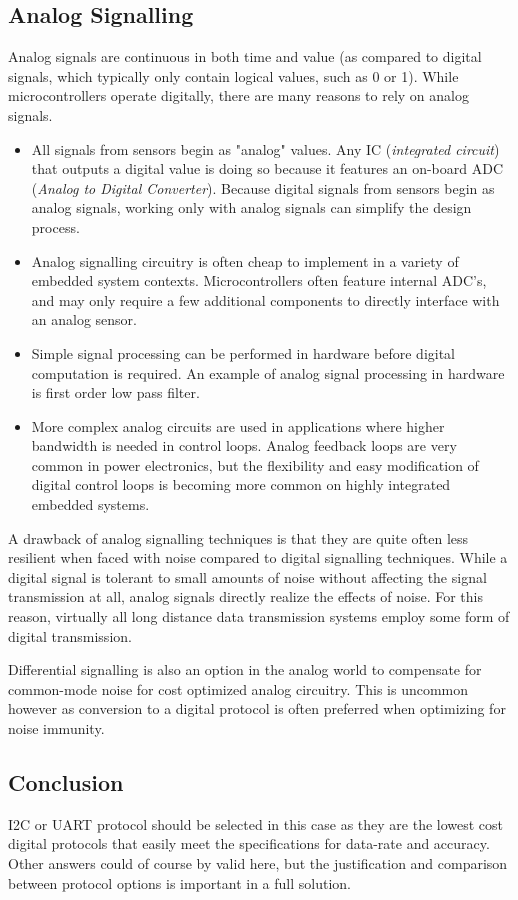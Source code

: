 \documentclass[main.tex]{subfiles}
\begin{document}
\subsection{Analog Signalling}
Analog signals are continuous in both time and value (as compared to digital signals, which typically only contain logical values, such as 0 or 1). While microcontrollers operate digitally, there are many reasons to rely on analog signals.
\begin{itemize}
    \item All signals from sensors begin as "analog" values. Any IC (\textit{integrated circuit}) that outputs a digital value is doing so because it features an on-board ADC (\textit{Analog to Digital Converter}). Because digital signals from sensors begin as analog signals, working only with analog signals can simplify the design process.
    \item Analog signalling circuitry is often cheap to implement in a variety of embedded system contexts. Microcontrollers often feature internal ADC's, and may only require a few additional components to directly interface with an analog sensor.
    \item Simple signal processing can be performed in hardware before digital computation is required. An example of analog signal processing in hardware is first order low pass filter. 
    \item More complex analog circuits are used in applications where higher bandwidth is needed in control loops. Analog feedback loops are very common in power electronics, but the flexibility and easy modification of digital control loops is becoming more common on highly integrated embedded systems.
\end{itemize}

\noindent A drawback of analog signalling techniques is that they are quite often less resilient when faced with noise compared to digital signalling techniques. While a digital signal is tolerant to small amounts of noise without affecting the signal transmission at all, analog signals directly realize the effects of noise. For this reason, virtually all long distance data transmission systems employ some form of digital transmission. \newline

\newnoindentpara Differential signalling is also an option in the analog world to compensate for common-mode noise for cost optimized analog circuitry. This is uncommon however as conversion to a digital protocol is often preferred when optimizing for noise immunity. 

\subsection{Conclusion}

\noindent I2C or UART protocol should be selected in this case as they are the lowest cost digital protocols that easily meet the specifications for data-rate and accuracy. Other answers could of course by valid here, but the justification and comparison between protocol options is important in a full solution. 
\end{document}

